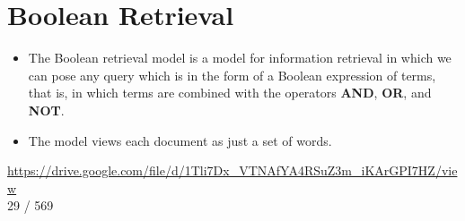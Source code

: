\chapter{Boolean Retrieval \cite{ir-1}}\label{Boolean retrieval}

\begin{itemize}
    \item The Boolean retrieval model is a model for information retrieval in which we can pose any query which is in the form of a Boolean expression of terms, that is, in which terms are combined with the operators \textbf{AND}, \textbf{OR}, and \textbf{NOT}.

    \item The model views each document as just a set of words.


\end{itemize}



\vspace{5cm}
\url{https://drive.google.com/file/d/1Tli7Dx_VTNAfYA4RSuZ3m_iKArGPI7HZ/view}\\
29 / 569





























